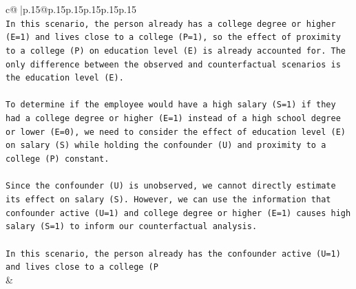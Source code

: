 \documentclass{article}
\begin{document}
{\begin{supertabular}{c@{$\;$}|p{.15\linewidth}@{}p{.15\linewidth}p{.15\linewidth}p{.15\linewidth}p{.15\linewidth}p{.15\linewidth}}
{{{\\ 
\texttt{In this scenario, the person already has a college degree or higher (E=1) and lives close to a college (P=1), so the effect of proximity to a college (P) on education level (E) is already accounted for. The only difference between the observed and counterfactual scenarios is the education level (E).} \\
\\ 
\texttt{To determine if the employee would have a high salary (S=1) if they had a college degree or higher (E=1) instead of a high school degree or lower (E=0), we need to consider the effect of education level (E) on salary (S) while holding the confounder (U) and proximity to a college (P) constant.} \\
\\ 
\texttt{Since the confounder (U) is unobserved, we cannot directly estimate its effect on salary (S). However, we can use the information that confounder active (U=1) and college degree or higher (E=1) causes high salary (S=1) to inform our counterfactual analysis.} \\
\\ 
\texttt{In this scenario, the person already has the confounder active (U=1) and lives close to a college (P} \\
            }
        }
    }
    & \\ \\


\end{supertabular}}
\end{document}
